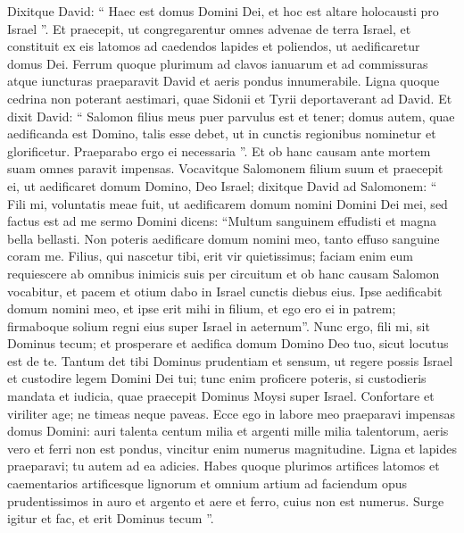 \begin{biblechapter}
\begin{biblechapter}
\begin{biblechapter}
\begin{biblechapter}
\begin{biblechapter}
\begin{biblechapter}
\begin{biblechapter}
\begin{biblechapter}
\begin{biblechapter}
\begin{biblechapter}
\begin{biblechapter}
\begin{biblechapter}
\begin{biblechapter}
\begin{biblechapter}
\begin{biblechapter}
\begin{biblechapter}
\begin{biblechapter}
\begin{biblechapter}
\begin{biblechapter}
\begin{biblechapter}
\begin{biblechapter}
\begin{biblechapter}
\verse Dixitque David: “ Haec est domus Domini Dei, et hoc est altare holocausti pro Israel ”.
 \verse Et praecepit, ut congregarentur omnes advenae de terra Israel, et constituit ex eis latomos ad caedendos lapides et poliendos, ut aedificaretur domus Dei. 
 \verse Ferrum quoque plurimum ad clavos ianuarum et ad commissuras atque iuncturas praeparavit David et aeris pondus innumerabile. 
\verse Ligna quoque cedrina non poterant aestimari, quae Sidonii et Tyrii deportaverant ad David. 
\verse Et dixit David: “ Salomon filius meus puer parvulus est et tener; domus autem, quae aedificanda est Domino, talis esse debet, ut in cunctis regionibus nominetur et glorificetur. Praeparabo ergo ei necessaria ”. Et ob hanc causam ante mortem suam omnes paravit impensas.
 \verse Vocavitque Salomonem filium suum et praecepit ei, ut aedificaret domum Domino, Deo Israel; 
\verse dixitque David ad Salomonem: “ Fili mi, voluntatis meae fuit, ut aedificarem domum nomini Domini Dei mei, 
\verse sed factus est ad me sermo Domini dicens: “Multum sanguinem effudisti et magna bella bellasti. Non poteris aedificare domum nomini meo, tanto effuso sanguine coram me. 
\verse Filius, qui nascetur tibi, erit vir quietissimus; faciam enim eum requiescere ab omnibus inimicis suis per circuitum et ob hanc causam Salomon vocabitur, et pacem et otium dabo in Israel cunctis diebus eius. 
\verse Ipse aedificabit domum nomini meo, et ipse erit mihi in filium, et ego ero ei in patrem; firmaboque solium regni eius super Israel in aeternum”. 
\verse Nunc ergo, fili mi, sit Dominus tecum; et prosperare et aedifica domum Domino Deo tuo, sicut locutus est de te. 
 \verse Tantum det tibi Dominus prudentiam et sensum, ut regere possis Israel et custodire legem Domini Dei tui; 
\verse tunc enim proficere poteris, si custodieris mandata et iudicia, quae praecepit Dominus Moysi super Israel. Confortare et viriliter age; ne timeas neque paveas. 
\verse Ecce ego in labore meo praeparavi impensas domus Domini: auri talenta centum milia et argenti mille milia talentorum, aeris vero et ferri non est pondus, vincitur enim numerus magnitudine. Ligna et lapides praeparavi; tu autem ad ea adicies. 
\verse Habes quoque plurimos artifices latomos et caementarios artificesque lignorum et omnium artium ad faciendum opus prudentissimos 
\verse in auro et argento et aere et ferro, cuius non est numerus. Surge igitur et fac, et erit Dominus tecum ”.

\end{biblechapter}
\end{biblechapter}
\end{biblechapter}
\end{biblechapter}
\end{biblechapter}
\end{biblechapter}
\end{biblechapter}
\end{biblechapter}
\end{biblechapter}
\end{biblechapter}
\end{biblechapter}
\end{biblechapter}
\end{biblechapter}
\end{biblechapter}
\end{biblechapter}
\end{biblechapter}
\end{biblechapter}
\end{biblechapter}
\end{biblechapter}
\end{biblechapter}
\end{biblechapter}
\end{biblechapter}
